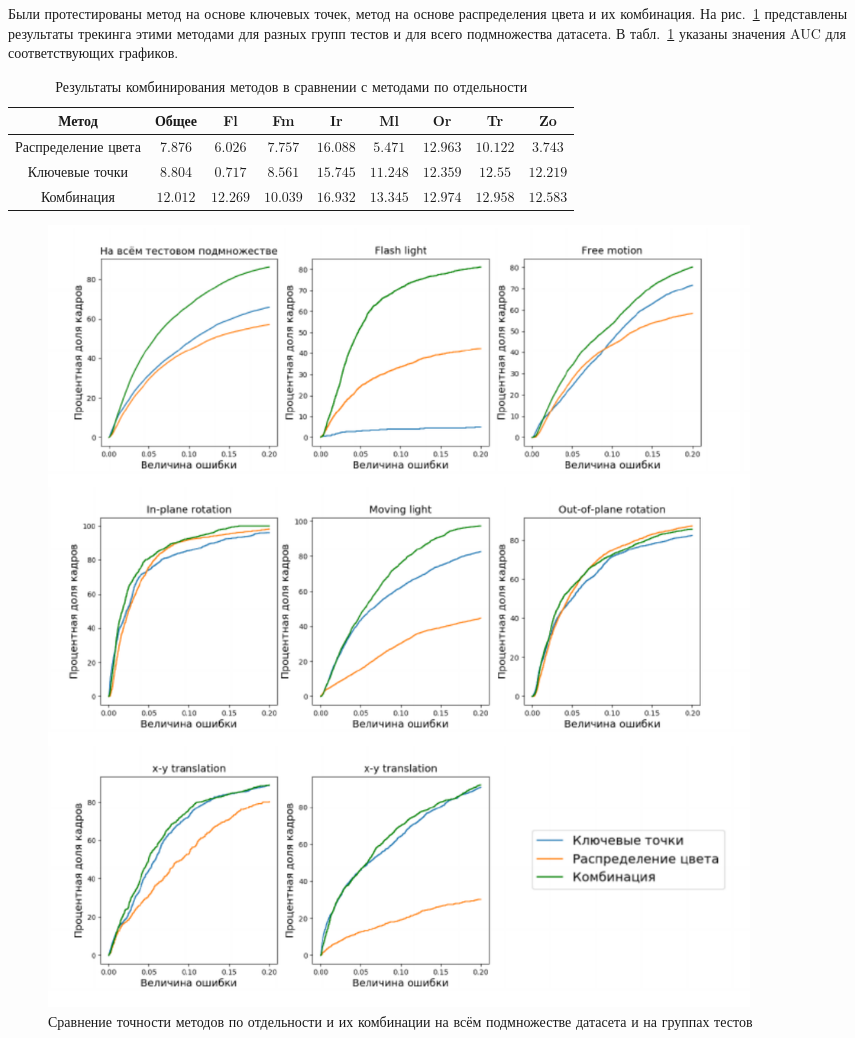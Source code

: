 Были протестированы метод на основе ключевых точек, метод на основе
распределения цвета и их комбинация.
На рис.~\ref{fig:combining-plots} представлены результаты трекинга этими
методами для разных групп тестов и для всего подмножества датасета.
В табл.~\ref{tab:combine} указаны значения AUC для соответствующих графиков.

\begin{table}[h]
\caption{\label{tab:combine}Результаты комбинирования методов в сравнении с
методами по отдельности}
\begin{center}
\begin{tabular}{|c|c|c|c|c|c|c|c|c|}
\hline
Метод & Общее & Fl & Fm & Ir & Ml & Or & Tr & Zo \\
\hline
Распределение цвета & 7.876 & $6.026$ & $7.757$ & $16.088$ & $5.471$ & $12.963$
&
$10.122$ & $3.743$ \\
\hline
Ключевые точки & 8.804 & $0.717$ & $8.561$ & $15.745$ & $11.248$ & $12.359$ &
$12.55$
&$12.219$ \\
\hline
Комбинация & $\mathbf{12.012}$ & $\mathbf{12.269}$ & $\mathbf{10.039}$ &
$\mathbf{16.932}$ &
$\mathbf{13.345}$ & $\mathbf{12.974}$ & $\mathbf{12.958}$ &
$\mathbf{12.583}$ \\
\hline
\end{tabular}
\end{center}
\end{table}

\begin{figure}
\centering
\includegraphics[width=0.9\textwidth]{fig/Combining.pdf}
\caption{
Сравнение точности методов по отдельности и их комбинации на всём подмножестве
датасета и на группах тестов
}
\label{fig:combining-plots}
\end{figure}

